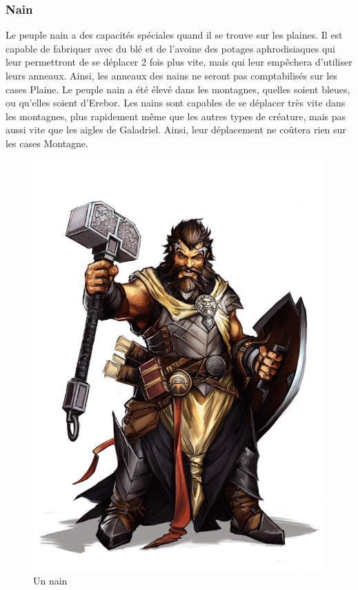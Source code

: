 \subsubsection{Nain}
Le peuple nain a des capacités spéciales quand il se trouve sur les plaines. Il est capable de fabriquer avec du blé et de l'avoine des potages aphrodisiaques qui leur permettront de se déplacer 2 fois plus vite, mais qui leur empêchera d'utiliser leurs anneaux.
\newline
 Ainsi, les anneaux des nains ne seront pas comptabilisés sur les cases Plaine.
\newline
\newline
Le peuple nain a été élevé dans les montagnes, quelles soient bleues, ou qu'elles soient d'Erebor. Les nains sont capables de se déplacer très vite dans les montagnes, plus rapidement même que les autres types de créature, mais pas aussi vite que les aigles de Galadriel.
\newline Ainsi, leur déplacement ne coûtera rien sur les cases Montagne.

\begin{figure}[ht!]
\centering
\includegraphics[scale=0.10]{img/dwarf.png}
\caption{Un nain}
\end{figure}

